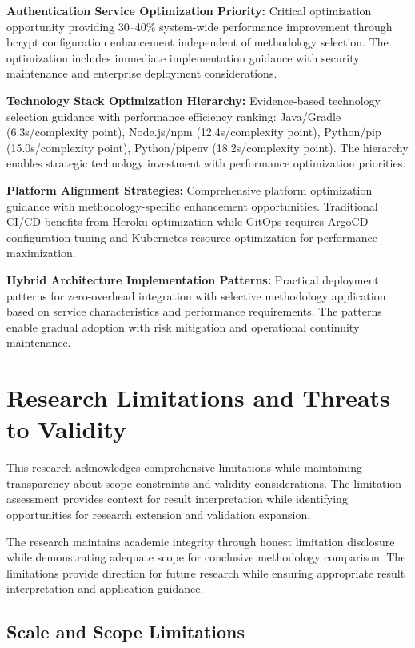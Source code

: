 \textbf{Authentication Service Optimization Priority:}
Critical optimization opportunity providing 30--40\% system-wide performance improvement through bcrypt configuration enhancement independent of methodology selection. The optimization includes immediate implementation guidance with security maintenance and enterprise deployment considerations.

\textbf{Technology Stack Optimization Hierarchy:}
Evidence-based technology selection guidance with performance efficiency ranking: Java/Gradle (6.3s/complexity point), Node.js/npm (12.4s/complexity point), Python/pip (15.0s/complexity point), Python/pipenv (18.2s/complexity point). The hierarchy enables strategic technology investment with performance optimization priorities.

\textbf{Platform Alignment Strategies:}
Comprehensive platform optimization guidance with methodology-specific enhancement opportunities. Traditional CI/CD benefits from Heroku optimization while GitOps requires ArgoCD configuration tuning and Kubernetes resource optimization for performance maximization.

\textbf{Hybrid Architecture Implementation Patterns:}
Practical deployment patterns for zero-overhead integration with selective methodology application based on service characteristics and performance requirements. The patterns enable gradual adoption with risk mitigation and operational continuity maintenance.

\section{Research Limitations and Threats to Validity}
\label{sec:research_limitations}

This research acknowledges comprehensive limitations while maintaining transparency about scope constraints and validity considerations. The limitation assessment provides context for result interpretation while identifying opportunities for research extension and validation expansion.

The research maintains academic integrity through honest limitation disclosure while demonstrating adequate scope for conclusive methodology comparison. The limitations provide direction for future research while ensuring appropriate result interpretation and application guidance.

\subsection{Scale and Scope Limitations}
\label{subsec:scale_limitations}

